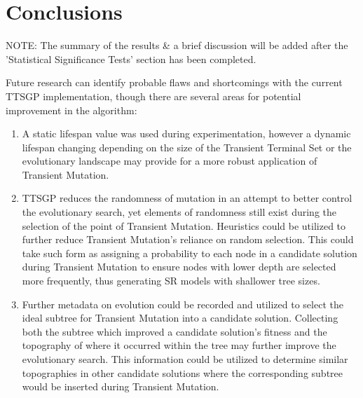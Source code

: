 \documentclass[a4paper, twocolumn]{article}
\begin{document}
\section{Conclusions}
NOTE: The summary of the results \& a brief discussion will be added after the 'Statistical Significance Tests' section has been completed.

Future research can identify probable flaws and shortcomings with the current TTSGP implementation, though there are several areas for potential improvement in the algorithm:
\begin{enumerate}
	\item A static lifespan value was used during experimentation, however a dynamic lifespan changing depending on the size of the Transient Terminal Set or the evolutionary landscape may provide for a more robust application of Transient Mutation. 
	\item TTSGP reduces the randomness of mutation in an attempt to better control the evolutionary search, yet elements of randomness still exist during the selection of the point of Transient Mutation. Heuristics could be utilized to further reduce Transient Mutation's reliance on random selection. This could take such form as assigning a probability to each node in a candidate solution during Transient Mutation to ensure nodes with lower depth are selected more frequently, thus generating SR models with shallower tree sizes. 
	\item Further metadata on evolution could be recorded and utilized to select the ideal subtree for Transient Mutation into a candidate solution. Collecting both the subtree which improved a candidate solution's fitness and the topography of where it occurred within the tree may further improve the evolutionary search. This information could be utilized to determine similar topographies in other candidate solutions where the corresponding subtree would be inserted during Transient Mutation.
\end{enumerate}
\medskip
\printbibliography
\end{document}
